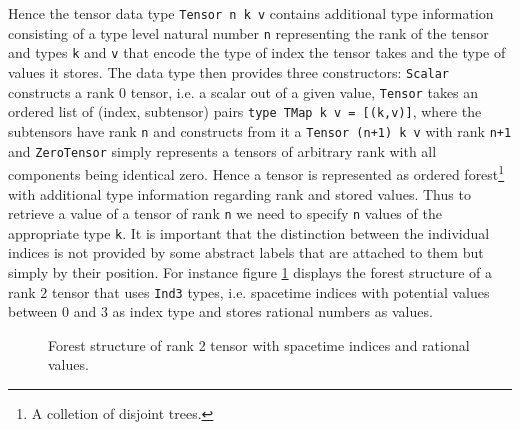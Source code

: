 \documentclass[a4paper,12pt, DIV=14, BCOR=5mm, twoside, headsepline]{scrbook}
\begin{document}
Hence the tensor data type \texttt{Tensor n k v} contains additional type information consisting of a type level natural number \texttt{n} representing the rank of the tensor and types \texttt{k} and \texttt{v} that encode the type of index the tensor takes and the type of values it stores. The data type then provides three constructors: \texttt{Scalar} constructs a rank 0 tensor, i.e. a scalar out of a given value, \texttt{Tensor} takes an ordered list of (index, subtensor) pairs \texttt{type TMap k v = [(k,v)]}, where the subtensors have rank \texttt{n} and constructs from it a \texttt{Tensor (n+1) k v} with rank \texttt{n+1} and \texttt{ZeroTensor} simply represents a tensors of arbitrary rank with all components being identical zero. Hence a tensor is represented as ordered forest\footnote{A colletion of disjoint trees.} with additional type information regarding rank and stored values.
Thus to retrieve a value of a tensor of rank \texttt{n} we need to specify \texttt{n} values of the appropriate type \texttt{k}. It is important that the distinction between the individual indices is not provided by some abstract labels that are attached to them but simply by their position. For instance figure \ref{ExampleTens} displays the forest structure of a rank $2$ tensor that uses \texttt{Ind3} types, i.e. spacetime indices with potential values between $0$ and $3$ as index type and stores rational numbers as values.
\begin{figure}[ht]
\centering
{}
\caption{Forest structure of rank 2 tensor with spacetime indices and rational values.}
\label{ExampleTens}
\end{figure}
\end{document}
